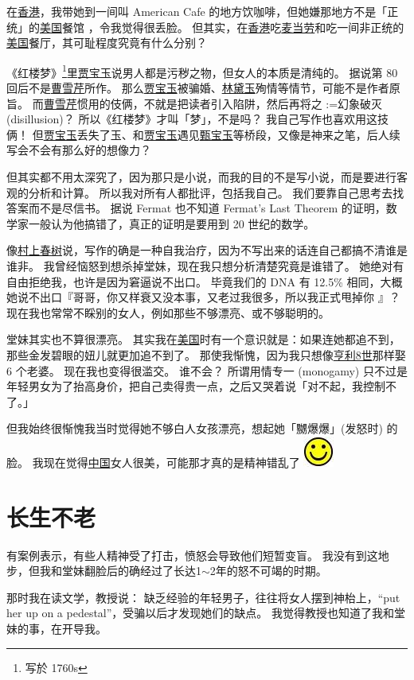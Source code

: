 \documentclass[12pt]{report}
\makeatletter
\renewcommand{\d}[1]{$\underaccent{\scalebox{0.5}{\textbullet}}{\textrm{#1}}$}
\newcommand{\ds}[1]{%
  \@tfor\next:=#1\do{\d{\next}}}
\newcommand*\smiley{\includegraphics[scale=0.5]{smiley.jpg}}
\makeatother
\begin{document}
在\uline{香港}，我带她到一间叫 American Cafe 的地方饮咖啡，但她嫌那地方不是「正统」的\uline{美国}餐馆 ，令我觉得很丢脸。 但其实，在\uline{香港}吃\uline{麦当劳}和吃一间非正统的\uline{美国}餐厅，其可耻程度究竟有什么分别？

《红楼梦》\footnote{写於 1760s}里\uline{贾宝玉}说男人都是污秽之物，但女人的本质是清纯的。 据说第 80 回后不是\uline{曹雪芹}所作。 那么\uline{贾宝玉}被骗婚、\uline{林黛玉}殉情等情节，可能不是作者原旨。 而\uline{曹雪芹}惯用的伎俩，不就是把读者引入陷阱，然后再将之\ds{幻象破灭}(disillusion)？ 所以《红楼梦》才叫「梦」，不是吗？ 我自己写作也喜欢用这技俩！ 但\uline{贾宝玉}丢失了玉、和\uline{贾宝玉}遇见\uline{甄宝玉}等桥段，又像是神来之笔，后人续写会不会有那么好的想像力？

但其实都不用太深究了，因为那只是小说，而我的目的不是写小说，而是要进行客观的分析和计算。 所以我对所有人都批评，包括我自己。 我们要靠自己思考去找答案而不是尽信书。 据说 Fermat 也不知道 Fermat's Last Theorem 的证明，数学家一般认为他搞错了，真正的证明是要用到 20 世纪的数学。

像\uline{村上春树}说，写作的确是一种自我治疗，因为不写出来的话连自己都搞不清谁是谁非。 我曾经恼怒到想杀掉堂妹，现在我只想分析清楚究竟是谁错了。 她绝对有自由拒绝我，也许是因为窘逼说不出口。 毕竟我们的 DNA 有 12.5\% 相同，大概她说不出口『哥哥，你又样衰又没本事，又老过我很多，所以我正式甩掉你 』？ 现在我也常常不睬别的女人，例如那些不够漂亮、或不够聪明的。

堂妹其实也不算很漂亮。 其实我在\uline{美国}时有一个意识就是：如果连她都追不到，那些金发碧眼的妞儿就更加追不到了。 那使我惭愧，因为我只想像\uline{亨利8世}那样娶 6 个老婆。 现在我也变得很滥交。 谁不会？  所谓用情专一 (monogamy) 只不过是年轻男女为了抬高身价，把自己卖得贵一点，之后又哭着说「对不起，我控制不了。」

但我始终很惭愧我当时觉得她不够白人女孩漂亮，想起她「嬲爆爆」(发怒时) 的脸。 我现在觉得\uline{中国}女人很美，可能那才真的是精神错乱了 \smiley

\chapter{长生不老}

有案例表示，有些人精神受了打击，愤怒会导致他们短暂变盲。 我没有到这地步，但我和堂妹翻脸后的确经过了长达1$\sim$2年的怒不可竭的时期。

那时我在读文学，教授说： 缺乏经验的年轻男子，往往将女人摆到神枱上，``put her up on a pedestal''，受骗以后才发现她们的缺点。  我觉得教授也知道了我和堂妹的事，在开导我。
\end{document}
